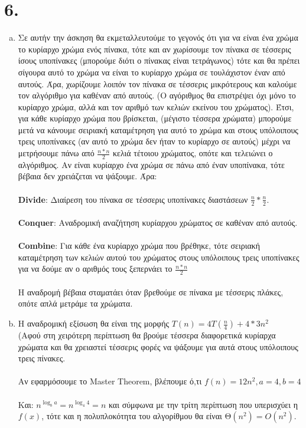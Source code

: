 \documentclass{article}
\begin{document}
\section*{6.}
\begin{enumerate}[(a)]%
\item
Σε αυτήν την άσκηση θα εκμεταλλευτούμε το γεγονός ότι για να είναι ένα χρώμα το κυρίαρχο χρώμα ενός πίνακα, τότε και αν χωρίσουμε τον πίνακα σε τέσσερις ίσους υποπίνακες (μπορούμε διότι ο πίνακας είναι τετράγωνος) τότε και θα πρέπει σίγουρα αυτό το χρώμα να είναι το κυρίαρχο χρώμα σε τουλάχιστον έναν από αυτούς. Άρα, χωρίζουμε λοιπόν τον πίνακα σε τέσσερις μικρότερους και καλούμε τον αλγόριθμο για καθέναν από αυτούς. (Ο αγόριθμος θα επιστρέψει όχι μόνο το κυρίαρχο χρώμα, αλλά και τον αριθμό των κελιών εκείνου του χρώματος). Έτσι, για κάθε κυρίαρχο χρώμα που βρίσκεται, (μέγιστο τέσσερα χρώματα) μπορούμε μετά να κάνουμε σειριακή καταμέτρηση για αυτό το χρώμα και στους υπόλοιπους τρεις υποπίνακες (αν αυτό το χρώμα δεν ήταν το κυρίαρχο σε αυτούς) μέχρι να μετρήσουμε πάνω από $\frac{n*n}{2}$ κελιά τέτοιου χρώματος, οπότε και τελειώνει ο αλγόριθμος. Αν είναι κυρίαρχο ένα χρώμα σε πάνω από έναν υποπίνακα, τότε βέβαια δεν χρειάζεται να ψάξουμε. Άρα:\\\\

\textlatin{\textbf{Divide}}: Διαίρεση του πίνακα σε τέσσερις υποπίνακες διαστάσεων $\frac{n}{2}*\frac{n}{2}$.\\\\
\textlatin{\textbf{Conquer}}: Αναδρομική αναζήτηση κυρίαρχου χρώματος σε καθέναν από αυτούς.\\\\
\textlatin{\textbf{Combine}}: Για κάθε ένα κυρίαρχο χρώμα που βρέθηκε, τότε σειριακή καταμέτρηση των κελιών αυτού του χρώματος στους υπόλοιπους τρεις υποπίνακες για να δούμε αν ο αριθμός τους ξεπερνάει το $\frac{n*n}{2}$\\\\

Η αναδρομή βέβαια σταματάει όταν βρεθούμε σε πίνακα με τέσσερις πλάκες, οπότε απλά μετράμε τα χρώματα.\\

\item
Η αναδρομική εξίσωση θα είναι της μορφής  $T(n) = 4T(\frac{n}{4}) + 4*3n^2$\\
(Αφού στη χειρότερη περίπτωση θα βρούμε τέσσερα διαφορετικά κυρίαρχα χρώματα και θα χρειαστεί τέσσερις φορές να ψάξουμε για αυτά στους υπόλοιπους τρεις πίνακες.\\\\
Αν εφαρμόσουμε το \textlatin{Master Theorem}, βλέπουμε ό,τι $f(n) = 12n^2, a=4, b=4$\\\\
Και:  $n^{\log_b{a}} = n^{\log_4{4}} = n$ και σύμφωνα με την τρίτη περίπτωση που υπερισχύει η $f(x)$, τότε και η πολυπλοκότητα του αλγορίθμου θα είναι Θ$(n^2) = O(n^2)$.\\


\end{enumerate}
\end{document}
